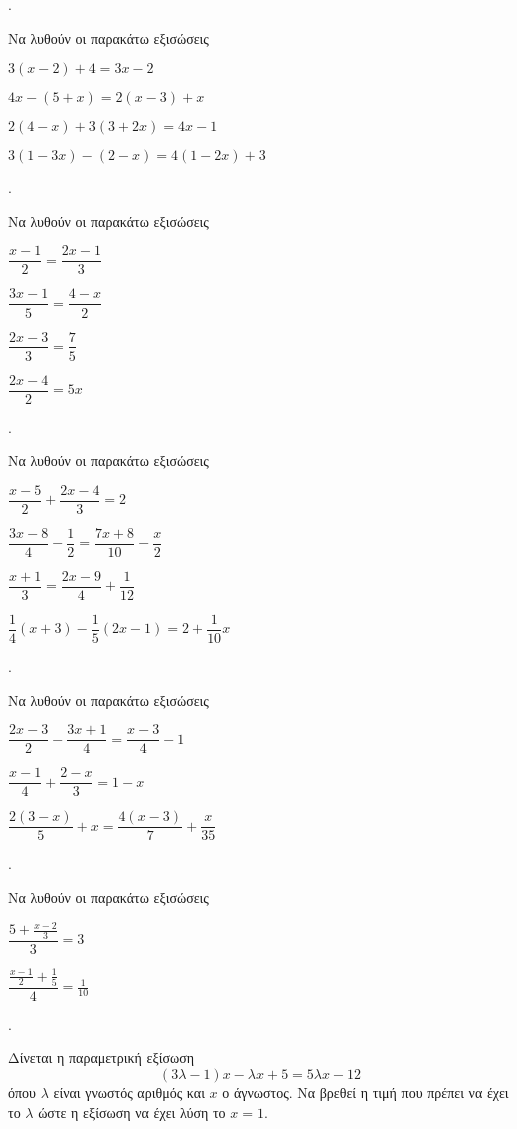 \documentclass[11pt,a4paper,twocolumn]{article}
\newcounter{askhsh}
\newcommand{\askhsh}{\large\theaskhsh.\ \addtocounter{askhsh}{1}}
\begin{document}
\askhsh Να λυθούν οι παρακάτω εξισώσεις
\begin{alist}
\item $ 3(x-2)+4=3x-2 $
\item $ 4x-(5+x)=2(x-3)+x $
\item $ 2(4-x)+3(3+2x)=4x-1 $
\item $ 3(1-3x)-(2-x)=4(1-2x)+3 $
\end{alist}
\askhsh Να λυθούν οι παρακάτω εξισώσεις
\begin{multicols}{2}
\begin{alist}[leftmargin=4mm]
\item $ \dfrac{x-1}{2}=\dfrac{2x-1}{3} $
\item $ \dfrac{3x-1}{5}=\dfrac{4-x}{2} $
\item $ \dfrac{2x-3}{3}=\dfrac{7}{5} $
\item $ \dfrac{2x-4}{2}=5x $
\end{alist}
\end{multicols}
\askhsh Να λυθούν οι παρακάτω εξισώσεις
\begin{alist}
\item $ \dfrac{x-5}{2}+\dfrac{2x-4}{3}=2 $
\item $ \dfrac{3x-8}{4}-\dfrac{1}{2}=\dfrac{7x+8}{10}-\dfrac{x}{2} $
\item $ \dfrac{x+1}{3}=\dfrac{2x-9}{4}+\dfrac{1}{12} $
\item $ \dfrac{1}{4}(x+3)-\dfrac{1}{5}(2x-1)=2+\dfrac{1}{10}x $
\end{alist}
\askhsh Να λυθούν οι παρακάτω εξισώσεις
\begin{alist}
\item $ \dfrac{2x-3}{2}-\dfrac{3x+1}{4}=\dfrac{x-3}{4}-1 $
\item $ \dfrac{x-1}{4}+\dfrac{2-x}{3}=1-x $
\item $ \dfrac{2(3-x)}{5}+x=\dfrac{4(x-3)}{7}+\dfrac{x}{35} $
\end{alist}
\askhsh Να λυθούν οι παρακάτω εξισώσεις
\begin{multicols}{2}
\begin{alist}
\item $ \dfrac{5+\frac{x-2}{3}}{3}=3 $
\item $ \dfrac{\frac{x-1}{2}+\frac{1}{5}}{4}=\frac{1}{10} $
\end{alist}
\end{multicols}
\askhsh Δίνεται η παραμετρική εξίσωση \[ (3\lambda-1)x-\lambda x+5=5\lambda x-12 \]
όπου $ \lambda $ είναι γνωστός αριθμός και $ x $ ο άγνωστος. Να βρεθεί η τιμή που πρέπει να έχει το $ \lambda $ ώστε η εξίσωση να έχει λύση το $ x=1 $.\\\\
\end{document}
